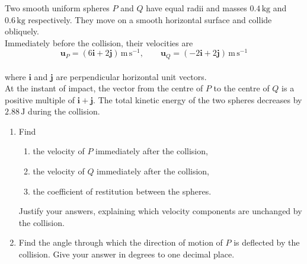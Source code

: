 \documentclass[leqno]{article}
\begin{document}
\begin{enumerate}[
  label=\textbf{\arabic*.},
  leftmargin=*,
  topsep=0pt,
  partopsep=0pt,
  parsep=0pt
]
\newpage

\questionitem

Two smooth uniform spheres $P$ and $Q$ have equal radii and masses $0.4\,\mathrm{kg}$ and $0.6\,\mathrm{kg}$ respectively. They move on a smooth horizontal surface and collide obliquely. \\

Immediately before the collision, their velocities are
\[
\mathbf{u}_P=(6\mathbf{i}+2\mathbf{j})\,\mathrm{m\,s^{-1}},\qquad \mathbf{u}_Q=(-2\mathbf{i}+2\mathbf{j})\,\mathrm{m\,s^{-1}}
\] \\
where $\mathbf{i}$ and $\mathbf{j}$ are perpendicular horizontal unit vectors. \\

At the instant of impact, the vector from the centre of $P$ to the centre of $Q$ is a positive multiple of $\mathbf{i}+\mathbf{j}$. The total kinetic energy of the two spheres decreases by $2.88\,\mathrm{J}$ during the collision. \\
\begin{enumerate}[label=\textbf{(\alph*)}]
\item Find
\begin{enumerate}[label=(\roman*)]
\item the velocity of $P$ immediately after the collision,
\item the velocity of $Q$ immediately after the collision,
\item the coefficient of restitution between the spheres.
\end{enumerate}
Justify your answers, explaining which velocity components are unchanged by the collision.  \\
\item Find the angle through which the direction of motion of $P$ is deflected by the collision. Give your answer in degrees to one decimal place.  \\
\end{enumerate}

\end{enumerate}
\end{document}
